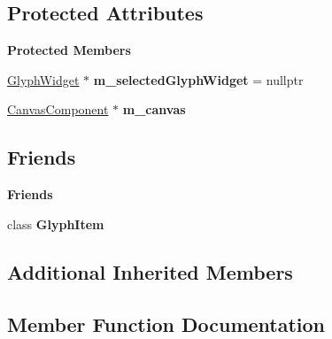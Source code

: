 \subsection*{Protected Attributes}
\begin{Indent}\textbf{ Protected Members}\par
\begin{DoxyCompactItemize}
\item 
\mbox{\label{classrev_1_1_view_1_1_canvas_glyph_widget_a0f2745fabfb12b4317fd313816931753}} 
\mbox{\hyperlink{classrev_1_1_view_1_1_glyph_widget}{Glyph\+Widget}} $\ast$ {\bfseries m\+\_\+selected\+Glyph\+Widget} = nullptr
\item 
\mbox{\label{classrev_1_1_view_1_1_canvas_glyph_widget_a5e7b3d838020245e3fbe191815998aac}} 
\mbox{\hyperlink{classrev_1_1_canvas_component}{Canvas\+Component}} $\ast$ {\bfseries m\+\_\+canvas}
\end{DoxyCompactItemize}
\end{Indent}
\subsection*{Friends}
\begin{Indent}\textbf{ Friends}\par
\begin{DoxyCompactItemize}
\item 
\mbox{\label{classrev_1_1_view_1_1_canvas_glyph_widget_ad9fee59a721da7d695c71926a01616d4}} 
class {\bfseries Glyph\+Item}
\end{DoxyCompactItemize}
\end{Indent}
\subsection*{Additional Inherited Members}


\subsection{Member Function Documentation}
\mbox{\label{classrev_1_1_view_1_1_canvas_glyph_widget_a2c05ba4850db7c75a954a4dcda3f980f}} 
